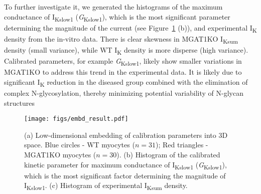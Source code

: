 \documentclass[11pt]{article}
\begin{document}
To further investigate it, we generated the histograms of the maximum conductance of I\textsubscript{Kslow1} (\textit{G}\textsubscript{Kslow1}), which is the most significant parameter determining the magnitude of the current (see Figure~\ref{fig:embd_result} (b)), and experimental I\textsubscript{K} density from the in-vitro data. There is clear skewness in MGAT1KO I\textsubscript{Ksum} density (small variance), while WT I\textsubscript{K} density is more disperse (high variance). Calibrated parameters, for example \textit{G}\textsubscript{Kslow1}, likely show smaller variations in MGAT1KO to address this trend in the experimental data. It is likely due to significant I\textsubscript{K} reduction in the diseased group combined with the elimination of complex N-glycosylation, thereby minimizing potential variability of N-glycan structures
\begin{figure}[!ht]
    \centering
    \texttt{[image: figs/embd\_result.pdf]}
    \caption{(a) Low-dimensional embedding of calibration parameters into 3D space. Blue circles - WT myocytes ($n=31$); Red triangles - MGAT1KO myocytes ($n=30$). (b) Histogram of the calibrated kinetic parameter for maximum conductance of I\textsubscript{Kslow1} (\textit{G}\textsubscript{Kslow1}), which is the most significant factor determining the magnitude of I\textsubscript{Kslow1}. (c) Histogram of experimental I\textsubscript{Ksum} density.}
    \label{fig:embd_result}
\end{figure}
\end{document}
